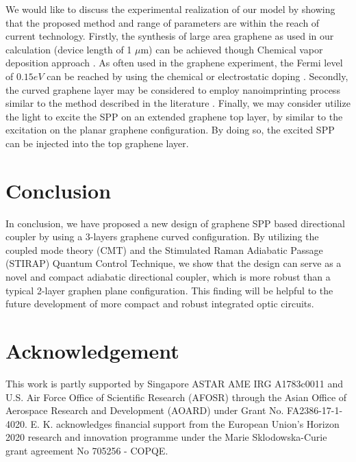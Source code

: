 \documentclass[preprint,12pt,numbers,sort&compress]{elsarticle}
\begin{document}
We would like to discuss the experimental realization of our model by showing that the proposed method and range of parameters are within the reach of current technology. Firstly, the synthesis of large area graphene as used in our calculation (device length of 1 $\mu$m) can be achieved though Chemical vapor deposition approach \cite{Xu16}. As often used in the graphene experiment, the Fermi level of $0.15 eV$ can be reached by using the chemical or electrostatic doping \cite{Novoselov04, Zhang05}. Secondly, the curved graphene layer may be considered to employ nanoimprinting process \cite{Xia16} similar to the method described in the literature \cite{Dostalek05}. Finally, we may consider utilize the light to excite the SPP on an extended graphene top layer, by similar to the excitation on the planar graphene configuration. By doing so, the excited SPP can be injected into the top graphene layer.

\section{Conclusion}
In conclusion, we have proposed a new design of graphene SPP based directional coupler by using a 3-layers graphene curved configuration.
By utilizing the coupled mode theory (CMT) and the Stimulated Raman Adiabatic Passage (STIRAP) Quantum Control Technique, we show that the design can serve as a novel and compact adiabatic directional coupler, which is more robust than a typical 2-layer graphen plane configuration.
This finding will be helpful to the future development of more compact and robust integrated optic circuits.

\section{Acknowledgement}
This work is partly supported by Singapore ASTAR AME IRG A1783c0011 and U.S. Air Force Office of Scientific Research (AFOSR) through the Asian Office of Aerospace Research and Development (AOARD) under Grant No. FA2386-17-1-4020. E. K. acknowledges financial support from the European Union’s Horizon 2020 research and innovation programme under the Marie Sklodowska-Curie grant agreement No 705256  - COPQE.
\end{document}
